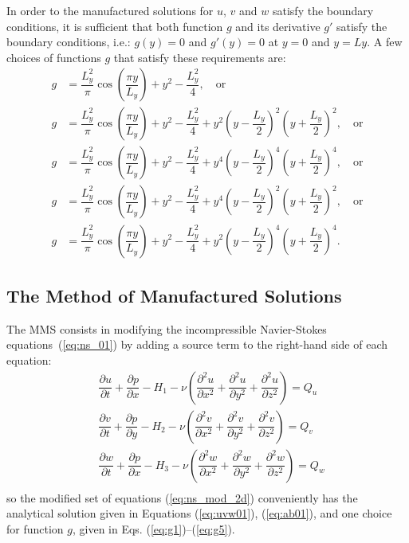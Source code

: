 \documentclass[10pt]{article}
\newcommand{\diff}[2] {\dfrac{\partial #1}{\partial #2}}
\begin{document}
In order to the manufactured solutions for $u$, $v$ and $w$ satisfy the boundary conditions, it is sufficient that both function $g$ and its derivative $g'$ satisfy the boundary conditions, i.e.: $g(y)=0$ and $g'(y)=0$ at $y=0$ and $y=Ly$. A few choices of functions $g$ that satisfy these requirements are:
\begin{align}
\label{eq:g1}
g &= \dfrac{L_y^2}{\pi} \cos\left(\dfrac{\pi y}{L_y}\right)+y^2-\dfrac{L_y^2}{4} , \quad \mbox{or}\\
\label{eq:g2}
g &= \dfrac{L_y^2}{\pi} \cos\left(\dfrac{\pi y}{L_y}\right)+y^2-\dfrac{L_y^2}{4} +y^2 \left(y-\dfrac{L_y}{2} \right)^2 \left(y+\dfrac{L_y}{2} \right)^2, \quad \mbox{or}\\
\label{eq:g3}
g &= \dfrac{L_y^2}{\pi} \cos\left(\dfrac{\pi y}{L_y}\right)+y^2-\dfrac{L_y^2}{4} +y^4 \left(y-\dfrac{L_y}{2} \right)^4 \left(y+\dfrac{L_y}{2} \right)^4, \quad \mbox{or}\\
\label{eq:g4}
g &= \dfrac{L_y^2}{\pi} \cos\left(\dfrac{\pi y}{L_y}\right)+y^2-\dfrac{L_y^2}{4} +y^4  \left(y-\dfrac{L_y}{2} \right)^2\left(y+\dfrac{L_y}{2} \right)^2, \quad \mbox{or}\\
\label{eq:g5}
g &= \dfrac{L_y^2}{\pi} \cos\left(\dfrac{\pi y}{L_y}\right)+y^2-\dfrac{L_y^2}{4} +y^2 \left(y-\dfrac{L_y}{2} \right)^4 \left(y+\dfrac{L_y}{2} \right)^4.
\end{align}



\subsection{The Method of Manufactured Solutions}


The MMS consists in modifying the incompressible Navier-Stokes equations~(\ref{eq:ns_01}) by adding a source term to the right-hand side of each equation:
\begin{equation}
\begin{split}\label{eq:ns_mod_2d}
&\diff{u}{t}  + \diff{p}{x} -H_1 -  \nu\left(\diff{^2 u}{ x^2}+\diff{^2 u}{ y^2}+\diff{^2 u}{ z^2} \right)=Q_u\\
&\diff{v}{t}  + \diff{p}{y} -H_2 -  \nu\left(\diff{^2 v}{ x^2}+\diff{^2 v}{ y^2}+\diff{^2 v}{ z^2} \right)=Q_v\\
&\diff{w}{t}  + \diff{p}{x} -H_3 -  \nu\left(\diff{^2 w}{ x^2}+\diff{^2 w}{ y^2}+\diff{^2 w}{ z^2} \right)=Q_w\\
\end{split}
\end{equation}
so the modified set of equations (\ref{eq:ns_mod_2d}) conveniently has the analytical solution given in Equations (\ref{eq:uvw01}), (\ref{eq:ab01}), and one choice for function $g$, given in Eqs. (\ref{eq:g1})--(\ref{eq:g5}).
\end{document}

